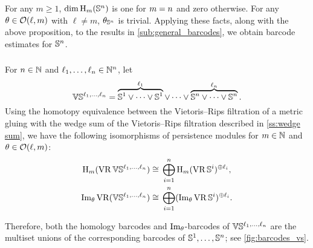 
\subsubsection{}

For any \(m \geq 1\), \(\dim \operatorname{H}_m(\mathbb{S}^n)\) is one for \(m = n\) and zero otherwise.
For any \(\theta \in \mathcal{O}(\ell, m)\) with \(\ell \neq m\), \(\theta_{\mathbb{S}^n}\) is trivial.
Applying these facts, along with the above proposition, to the results in \cref{sub:general_barcodes}, we obtain barcode estimates for \(\mathbb{S}^n\).


\subsubsection{}

For $n \in \mathbb{N}$ and $\ell_1, \dots, \ell_n \in \mathbb{N}^n$, let
\[
\mathbb{V}\mathbb{S}^{\ell_1,\dots,\ell_n} =
\overbrace{\mathbb{S}^1\vee\dots\vee\mathbb{S}^1}^{\ell_1} \vee\dots\vee \overbrace{\mathbb{S}^n\vee\dots\vee\mathbb{S}^n}^{\ell_n}.
\]
Using the homotopy equivalence between the Vietoris--Rips filtration of a metric gluing with the wedge sum of the Vietoris--Rips filtration described in \cref{ss:wedge sum}, we have the following isomorphisms of persistence modules for \(m \in \mathbb{N}\) and \(\theta \in \mathcal{O}(\ell,m)\):
\[
\begin{split}
	\mathrm{H}_m (\operatorname{VR}\mathbb{V}\mathbb{S}^{\ell_1,\dots,\ell_n}) &\cong \, \bigoplus_{i=1}^n \mathrm{H}_m (\operatorname{VR}\mathbb{S}^i)^{\oplus \ell_i}, \\
	\operatorname{Im}_\theta \operatorname{VR}(\mathbb{V}\mathbb{S}^{\ell_1,\dots,\ell_n}) &\cong \, \bigoplus_{i=1}^n (\operatorname{Im}_\theta \operatorname{VR}\mathbb{S}^i)^{\oplus \ell_i}.
\end{split}
\]

Therefore, both the homology barcodes and \(\operatorname{Im}_\theta\)-barcodes of \(\mathbb{V}\mathbb{S}^{\ell_1, \dots, \ell_n}\) are the multiset unions of the corresponding barcodes of \(\mathbb{S}^1, \dots, \mathbb{S}^n\); see \cref{fig:barcodes_vs}.

